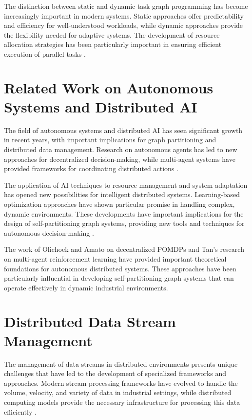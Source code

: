 The distinction between static and dynamic task graph programming has become increasingly important in modern systems. Static approaches offer predictability and efficiency for well-understood workloads, while dynamic approaches provide the flexibility needed for adaptive systems. The development of resource allocation strategies has been particularly important in ensuring efficient execution of parallel tasks \cite{technical2023}.

\section{Related Work on Autonomous Systems and Distributed AI}
The field of autonomous systems and distributed AI has seen significant growth in recent years, with important implications for graph partitioning and distributed data management. Research on autonomous agents has led to new approaches for decentralized decision-making, while multi-agent systems have provided frameworks for coordinating distributed actions \cite{rl2023}.

The application of AI techniques to resource management and system adaptation has opened new possibilities for intelligent distributed systems. Learning-based optimization approaches have shown particular promise in handling complex, dynamic environments. These developments have important implications for the design of self-partitioning graph systems, providing new tools and techniques for autonomous decision-making \cite{gnn2023}.

The work of Oliehoek and Amato \cite{oliehoek2016concise} on decentralized POMDPs and Tan's \cite{tan1993multi} research on multi-agent reinforcement learning have provided important theoretical foundations for autonomous distributed systems. These approaches have been particularly influential in developing self-partitioning graph systems that can operate effectively in dynamic industrial environments.

\section{Distributed Data Stream Management}
The management of data streams in distributed environments presents unique challenges that have led to the development of specialized frameworks and approaches. Modern stream processing frameworks have evolved to handle the volume, velocity, and variety of data in industrial settings, while distributed computing models provide the necessary infrastructure for processing this data efficiently \cite{iot2023}.

